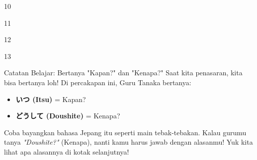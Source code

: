\begin{convobox}{10}
    \noindent

    \vspace{1.5em}
\end{convobox}

\begin{convobox}{11}
    \noindent
      
      

    \vspace{1.5em}
\end{convobox}

\begin{convobox}{12}
    \noindent
      
     

    \vspace{1.5em}
\end{convobox}

\begin{convobox}{13}
    \noindent
      
      

    \vspace{1.5em}
\end{convobox}

\begin{lessonbox}{Catatan Belajar: Bertanya "Kapan?" dan "Kenapa?"}
    Saat kita penasaran, kita bisa bertanya loh! Di percakapan ini, Guru Tanaka bertanya:
    \begin{itemize}
        \item \textbf{いつ (Itsu)} = Kapan?
        \item \textbf{どうして (Doushite)} = Kenapa?
    \end{itemize}
    Coba bayangkan bahasa Jepang itu seperti main tebak-tebakan. Kalau gurumu tanya \textit{"Doushite?"} (Kenapa), nanti kamu harus jawab dengan alasanmu! Yuk kita lihat apa alasannya di kotak selanjutnya!
\end{lessonbox}

